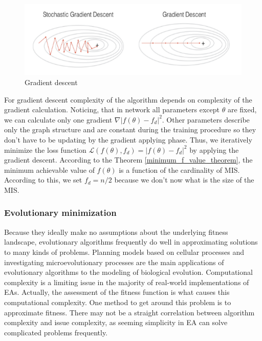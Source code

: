 \begin{figure}[h]
    \centering
    \includegraphics{figures/gradient_descent.png}
    \caption{Gradient descent}
    \label{fig:gradient_descent}
\end{figure}
 
 For gradient descent complexity of the algorithm depends on complexity of the gradient calculation. Noticing, that in network all parameters except $\theta$ are fixed, we can calculate only one gradient $\nabla |f(\theta) - f_d|^2$. Other parameters describe only the graph structure and are constant during the training procedure so they don't have to be updating by the gradient applying phase. 
 Thus, we iteratively minimize the loss function $\mathcal{L}(f(\theta),f_d)=|f(\theta)-f_d|^2$ by applying the gradient descent. 
 According to the Theorem \ref{minimum_f_value_theorem}, the minimum achievable value of $f(\theta)$ is a function of the cardinality of MIS. According to this, we set $f_d=n/2$ because we don't now what is the size of the MIS.

\subsubsection{Evolutionary minimization}

Because they ideally make no assumptions about the underlying fitness landscape, evolutionary algorithms frequently do well in approximating solutions to many kinds of problems. Planning models based on cellular processes and investigating microevolutionary processes are the main applications of evolutionary algorithms to the modeling of biological evolution. Computational complexity is a limiting issue in the majority of real-world implementations of EAs. Actually, the assessment of the fitness function is what causes this computational complexity. One method to get around this problem is to approximate fitness. There may not be a straight correlation between algorithm complexity and issue complexity, as seeming simplicity in EA can solve complicated problems frequently.

